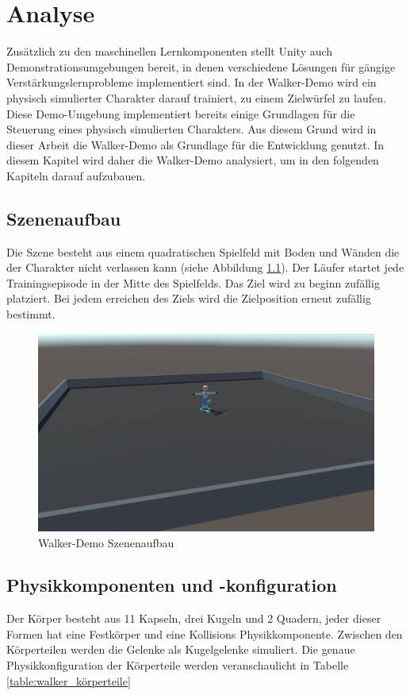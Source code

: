 {\chapter{Analyse}}
\label{sec:analyse}
Zusätzlich zu den maschinellen Lernkomponenten stellt Unity auch Demonstrationsumgebungen bereit, in denen verschiedene Lösungen für gängige Verstärkungslernprobleme implementiert sind. In der Walker-Demo wird ein physisch simulierter Charakter darauf trainiert, zu einem Zielwürfel zu laufen. Diese Demo-Umgebung implementiert bereits einige Grundlagen für die Steuerung eines physisch simulierten Charakters. Aus diesem Grund wird in dieser Arbeit die Walker-Demo als Grundlage für die Entwicklung genutzt. In diesem Kapitel wird daher die Walker-Demo analysiert, um in den folgenden Kapiteln darauf aufzubauen.

\section{Szenenaufbau}
Die Szene besteht aus einem quadratischen Spielfeld mit Boden und Wänden die der Charakter nicht verlassen kann (siehe Abbildung \ref{fig:walker_aufbau}). Der Läufer startet jede Trainingsepisode in der Mitte des Spielfelds. Das Ziel wird zu beginn zufällig platziert. Bei jedem erreichen des Ziels wird die Zielposition erneut zufällig bestimmt.

\begin{figure}[H]
  \centering  
  \includegraphics[scale=0.35]{img/walker_aufbau.png}
  \caption{Walker-Demo Szenenaufbau}
  \label{fig:walker_aufbau}
\end{figure}

\section{Physikkomponenten und -konfiguration}
Der Körper besteht aus 11 Kapseln, drei Kugeln und 2 Quadern, jeder dieser Formen hat eine Festkörper und eine Kollisions Physikkomponente. Zwischen den Körperteilen werden die Gelenke als Kugelgelenke simuliert. Die genaue Physikkonfiguration der Körperteile werden veranschaulicht in Tabelle \ref{table:walker_körperteile}

